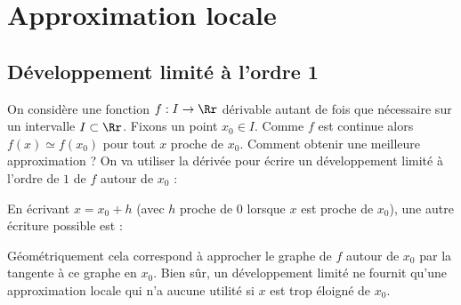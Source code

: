 \documentclass[11pt,class=report,crop=false]{standalone}
\begin{document}

%
%
%




\section{Approximation locale}


\subsection{Développement limité à l'ordre 1}

On considère une fonction $f : I \to \Rr$ dérivable autant de fois que nécessaire sur un intervalle $I \subset \Rr$.
Fixons un point $x_0 \in I$. Comme $f$ est continue alors $f(x) \simeq f(x_0)$ pour tout $x$ proche de $x_0$.
Comment obtenir une meilleure approximation ?
On va utiliser la dérivée pour écrire un développement limité à l'ordre de $1$ de $f$ autour de $x_0$ :

En écrivant $x = x_0+h$ (avec $h$ proche de $0$ lorsque $x$ est proche de $x_0$), une autre écriture possible est :

Géométriquement cela correspond à approcher le graphe de $f$ autour de $x_0$ par la tangente à ce graphe en $x_0$. Bien sûr, un développement limité 
ne fournit qu'une approximation locale qui n'a aucune utilité si $x$ est trop éloigné de $x_0$.
\end{document}
